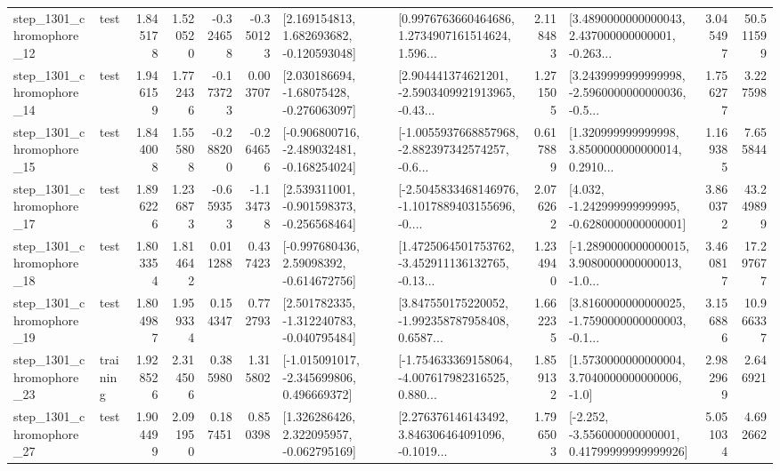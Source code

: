 \begin{tabular}{llrrrrllrlrr}
 step\_1301\_chromophore\_12 &      test &      1.845178 &    1.520520 &     -0.324658 & -0.350123 &    [2.169154813, 1.682693682, -0.120593048] &  [0.9976763660464686, 1.2734907161514624, 1.596... &       2.118483 &  [3.4890000000000043, 2.437000000000001, -0.263... &            3.045497 &         50.511599 \\
 step\_1301\_chromophore\_14 &      test &      1.946159 &    1.772436 &     -0.173723 &  0.003707 &    [2.030186694, -1.68075428, -0.276063097] &  [2.904441374621201, -2.5903409921913965, -0.43... &       1.271505 &  [3.2439999999999998, -2.5960000000000036, -0.5... &            1.756277 &          3.227598 \\
 step\_1301\_chromophore\_15 &      test &      1.844008 &    1.555808 &     -0.288200 & -0.264656 &  [-0.906800716, -2.489032481, -0.168254024] &  [-1.0055937668857968, -2.882397342574257, -0.6... &       0.617889 &  [1.320999999999998, 3.8500000000000014, 0.2910... &            1.169385 &          7.655844 \\
 step\_1301\_chromophore\_17 &      test &      1.896226 &    1.236873 &     -0.659353 & -1.134738 &   [2.539311001, -0.901598373, -0.256568464] &  [-2.5045833468146976, -1.1017889403155696, -0.... &       2.076262 &   [4.032, -1.242999999999995, -0.6280000000000001] &            3.860372 &         43.249899 \\
 step\_1301\_chromophore\_18 &      test &      1.803354 &    1.814642 &      0.011288 &  0.437423 &    [-0.997680436, 2.59098392, -0.614672756] &  [1.4725064501753762, -3.452911136132765, -0.13... &       1.234940 &  [-1.2890000000000015, 3.9080000000000013, -1.0... &            3.460817 &         17.297677 \\
 step\_1301\_chromophore\_19 &      test &      1.804987 &    1.959334 &      0.154347 &  0.772793 &   [2.501782335, -1.312240783, -0.040795484] &  [3.847550175220052, -1.992358787958408, 0.6587... &       1.662235 &  [3.8160000000000025, -1.7590000000000003, -0.1... &            3.156886 &         10.966337 \\
 step\_1301\_chromophore\_23 &  training &      1.928526 &    2.314506 &      0.385980 &  1.315802 &   [-1.015091017, -2.345699806, 0.496669372] &  [-1.754633369158064, -4.007617982316525, 0.880... &       1.859132 &     [1.5730000000000004, 3.7040000000000006, -1.0] &            2.982969 &          2.646921 \\
 step\_1301\_chromophore\_27 &      test &      1.904499 &    2.091950 &      0.187451 &  0.850398 &    [1.326286426, 2.322095957, -0.062795169] &  [2.276376146143492, 3.846306464091096, -0.1019... &       1.796503 &  [-2.252, -3.556000000000001, 0.41799999999999926] &            5.051034 &          4.692662 \\

\end{tabular}
